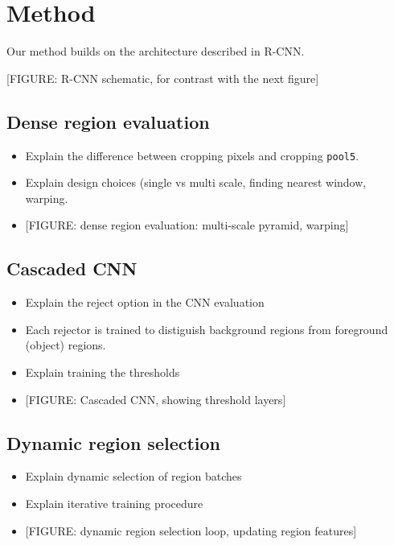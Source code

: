 \section{Method}\label{method}

Our method builds on the architecture described in R-CNN.

{[}FIGURE: R-CNN schematic, for contrast with the next figure{]}

\subsection{Dense region evaluation}\label{dense-region-evaluation}

\begin{itemize}
\itemsep1pt\parskip0pt
\item
  Explain the difference between cropping pixels and cropping
  \texttt{pool5}.
\item
  Explain design choices (single vs multi scale, finding nearest window,
  warping.
\item
  {[}FIGURE: dense region evaluation: multi-scale pyramid, warping{]}
\end{itemize}

\subsection{Cascaded CNN}\label{cascaded-cnn}

\begin{itemize}
\itemsep1pt\parskip0pt
\item
  Explain the reject option in the CNN evaluation
\item
  Each rejector is trained to distiguish background regions from
  foreground (object) regions.
\item
  Explain training the thresholds
\item
  {[}FIGURE: Cascaded CNN, showing threshold layers{]}
\end{itemize}

\subsection{Dynamic region selection}\label{dynamic-region-selection}

\begin{itemize}
\itemsep1pt\parskip0pt
\item
  Explain dynamic selection of region batches
\item
  Explain iterative training procedure
\item
  {[}FIGURE: dynamic region selection loop, updating region features{]}
\end{itemize}

